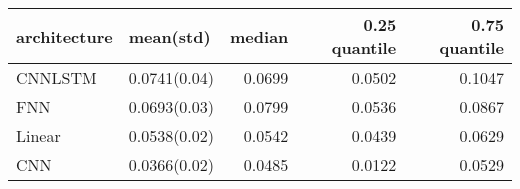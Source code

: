 \begin{tabular}{llrrr}
\toprule
architecture &    mean(std) &  median &  0.25 quantile &  0.75 quantile \\
\midrule
     CNNLSTM & 0.0741(0.04) &  0.0699 &         0.0502 &         0.1047 \\
         FNN & 0.0693(0.03) &  0.0799 &         0.0536 &         0.0867 \\
      Linear & 0.0538(0.02) &  0.0542 &         0.0439 &         0.0629 \\
         CNN & 0.0366(0.02) &  0.0485 &         0.0122 &         0.0529 \\
\bottomrule
\end{tabular}

